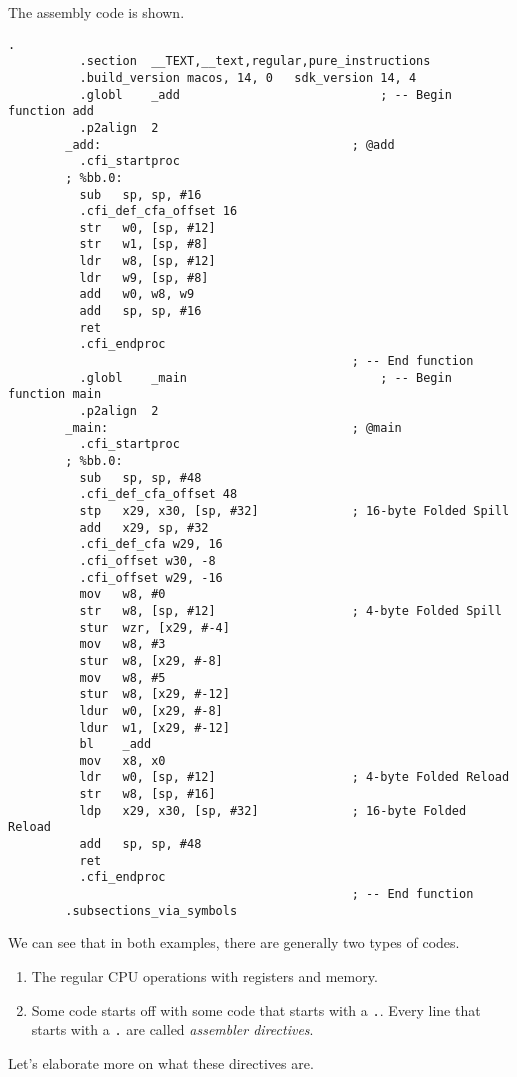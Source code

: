     \begin{example}
      The assembly code is shown. 
      \begin{lstlisting}[language={[x86masm]Assembler}]
        .
          .section	__TEXT,__text,regular,pure_instructions
          .build_version macos, 14, 0	sdk_version 14, 4
          .globl	_add                            ; -- Begin function add
          .p2align	2
        _add:                                   ; @add
          .cfi_startproc
        ; %bb.0:
          sub	sp, sp, #16
          .cfi_def_cfa_offset 16
          str	w0, [sp, #12]
          str	w1, [sp, #8]
          ldr	w8, [sp, #12]
          ldr	w9, [sp, #8]
          add	w0, w8, w9
          add	sp, sp, #16
          ret
          .cfi_endproc
                                                ; -- End function
          .globl	_main                           ; -- Begin function main
          .p2align	2
        _main:                                  ; @main
          .cfi_startproc
        ; %bb.0:
          sub	sp, sp, #48
          .cfi_def_cfa_offset 48
          stp	x29, x30, [sp, #32]             ; 16-byte Folded Spill
          add	x29, sp, #32
          .cfi_def_cfa w29, 16
          .cfi_offset w30, -8
          .cfi_offset w29, -16
          mov	w8, #0
          str	w8, [sp, #12]                   ; 4-byte Folded Spill
          stur	wzr, [x29, #-4]
          mov	w8, #3
          stur	w8, [x29, #-8]
          mov	w8, #5
          stur	w8, [x29, #-12]
          ldur	w0, [x29, #-8]
          ldur	w1, [x29, #-12]
          bl	_add
          mov	x8, x0
          ldr	w0, [sp, #12]                   ; 4-byte Folded Reload
          str	w8, [sp, #16]
          ldp	x29, x30, [sp, #32]             ; 16-byte Folded Reload
          add	sp, sp, #48
          ret
          .cfi_endproc
                                                ; -- End function
        .subsections_via_symbols
      \end{lstlisting}
    \end{example}
      
    We can see that in both examples, there are generally two types of codes. 
    \begin{enumerate}
      \item The regular CPU operations with registers and memory. 
      \item Some code starts off with some code that starts with a \texttt{.}. Every line that starts with a \texttt{.} are called \textit{assembler directives}. 
    \end{enumerate}
    Let's elaborate more on what these directives are. 

